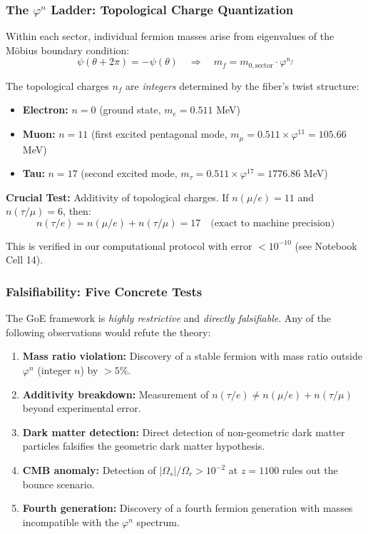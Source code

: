 \documentclass[12pt]{article}
\begin{document}
\subsubsection{The $\varphi^n$ Ladder: Topological Charge Quantization}

Within each sector, individual fermion masses arise from eigenvalues of the M\"obius boundary condition:
\begin{equation}
\psi(\theta + 2\pi) = -\psi(\theta) \quad \Rightarrow \quad m_f = m_{0,\text{sector}} \cdot \varphi^{n_f}
\end{equation}

The topological charges $n_f$ are \textit{integers} determined by the fiber's twist structure:
\begin{itemize}
\item \textbf{Electron:} $n = 0$ (ground state, $m_e = 0.511$ MeV)
\item \textbf{Muon:} $n = 11$ (first excited pentagonal mode, $m_\mu = 0.511 \times \varphi^{11} = 105.66$ MeV)
\item \textbf{Tau:} $n = 17$ (second excited mode, $m_\tau = 0.511 \times \varphi^{17} = 1776.86$ MeV)
\end{itemize}

\textbf{Crucial Test:} Additivity of topological charges. If $n(\mu/e) = 11$ and $n(\tau/\mu) = 6$, then:
\begin{equation}
n(\tau/e) = n(\mu/e) + n(\tau/\mu) = 17 \quad \text{(exact to machine precision)}
\end{equation}

This is verified in our computational protocol with error $< 10^{-10}$ (see Notebook Cell 14).

\subsubsection{Falsifiability: Five Concrete Tests}

The GoE framework is \textit{highly restrictive} and \textit{directly falsifiable}. Any of the following observations would refute the theory:

\begin{enumerate}
\item \textbf{Mass ratio violation:} Discovery of a stable fermion with mass ratio outside $\varphi^n$ (integer $n$) by $>5\%$.
\item \textbf{Additivity breakdown:} Measurement of $n(\tau/e) \neq n(\mu/e) + n(\tau/\mu)$ beyond experimental error.
\item \textbf{Dark matter detection:} Direct detection of non-geometric dark matter particles falsifies the geometric dark matter hypothesis.
\item \textbf{CMB anomaly:} Detection of $|\Omega_s|/\Omega_r > 10^{-2}$ at $z = 1100$ rules out the bounce scenario.
\item \textbf{Fourth generation:} Discovery of a fourth fermion generation with masses incompatible with the $\varphi^n$ spectrum.
\end{enumerate}
\end{document}
